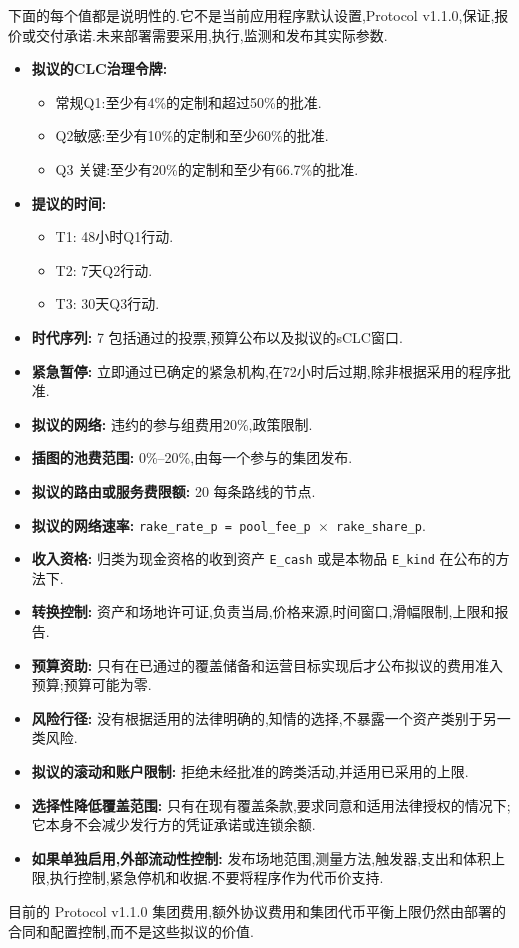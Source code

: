 \documentclass[11pt]{article}
\begin{document}
下面的每个值都是说明性的.它不是当前应用程序默认设置,Protocol v1.1.0,保证,报价或交付承诺.未来部署需要采用,执行,监测和发布其实际参数.

\begin{itemize}[leftmargin=*]
\item \textbf{拟议的CLC治理令牌:}
\begin{itemize}[leftmargin=*]
\item 常规Q1:至少有4\%的定制和超过50\%的批准.
\item Q2敏感:至少有10\%的定制和至少60\%的批准.
\item Q3 关键:至少有20\%的定制和至少有66.7\%的批准.
\end{itemize}
\item \textbf{提议的时间:}
\begin{itemize}[leftmargin=*]
\item T1: 48小时Q1行动.
\item T2: 7天Q2行动.
\item T3: 30天Q3行动.
\end{itemize}
\item \textbf{时代序列:} 7 包括通过的投票,预算公布以及拟议的sCLC窗口.
\item \textbf{紧急暂停:} 立即通过已确定的紧急机构,在72小时后过期,除非根据采用的程序批准.
\item \textbf{拟议的网络:} 违约的参与组费用20\%,政策限制.
\item \textbf{插图的池费范围:} 0\%--20\%,由每一个参与的集团发布.
\item \textbf{拟议的路由或服务费限额:} 20 每条路线的节点.
\item \textbf{拟议的网络速率:} \texttt{rake\_rate\_p = pool\_fee\_p $\times$ rake\_share\_p}.
\item \textbf{收入资格:} 归类为现金资格的收到资产 \texttt{E\_cash} 或是本物品 \texttt{E\_kind} 在公布的方法下.
\item \textbf{转换控制:} 资产和场地许可证,负责当局,价格来源,时间窗口,滑幅限制,上限和报告.
\item \textbf{预算资助:} 只有在已通过的覆盖储备和运营目标实现后才公布拟议的费用准入预算;预算可能为零.
\item \textbf{风险行径:} 没有根据适用的法律明确的,知情的选择,不暴露一个资产类别于另一类风险.
\item \textbf{拟议的滚动和账户限制:} 拒绝未经批准的跨类活动,并适用已采用的上限.
\item \textbf{选择性降低覆盖范围:} 只有在现有覆盖条款,要求同意和适用法律授权的情况下;它本身不会减少发行方的凭证承诺或连锁余额.
\item \textbf{如果单独启用,外部流动性控制:} 发布场地范围,测量方法,触发器,支出和体积上限,执行控制,紧急停机和收据.不要将程序作为代币价支持.
\end{itemize}
目前的 Protocol v1.1.0 集团费用,额外协议费用和集团代币平衡上限仍然由部署的合同和配置控制,而不是这些拟议的价值.
\end{document}
